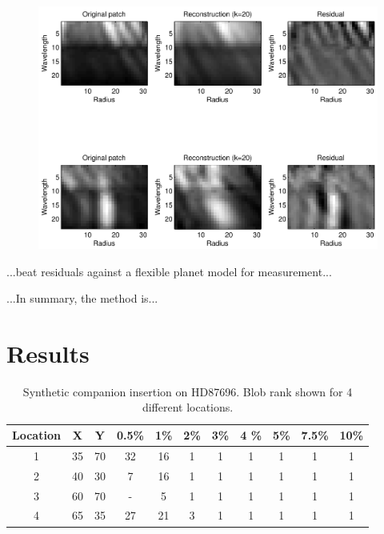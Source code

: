 \documentclass[12pt,pdftex,preprint]{aastex}
\begin{document}
\begin{figure}[h!]
\begin{center}
\includegraphics[width=5in]{figs/patch_reconstructions.pdf}
\end{center}
\vspace{-7mm}
\caption{}
\label{fig:patch_recon}
\end{figure}
  
 
...beat residuals against a flexible planet model for measurement...

...In summary, the method is...

\section{Results}

\begin{table}
\vspace{-15pt}
\begin{center}
\begin{tabular} { | c | c | c || c | c | c | c | c | c | c | c | } \hline
 Location & X & Y & 0.5\% &  1\% &  2\%  &  3\%  & 4 \% & 5\% & 7.5\%
 & 10\% \\ \hline \hline
 1    &   35  &    70  &   32  &    16  &    1  &     1  &     1  &     1   &    1  &     1\\ \hline
2    &   40  &    30  &  7  &    16  &    1  &     1  &     1  &     1   &    1  &     1\\ \hline
3    &   60  &    70  &   -  &    5  &    1  &     1  &     1  &     1   &    1  &     1\\ \hline
 4    &   65  &   35  &   27  &   21  &    3  &     1  &     1  &     1   &    1  &     1\\ \hline
\end{tabular}
\end{center}
\caption{Synthetic companion insertion on HD87696. Blob rank shown for 4 different locations.}
\label{table:result1}
\end{table}
\end{document}
